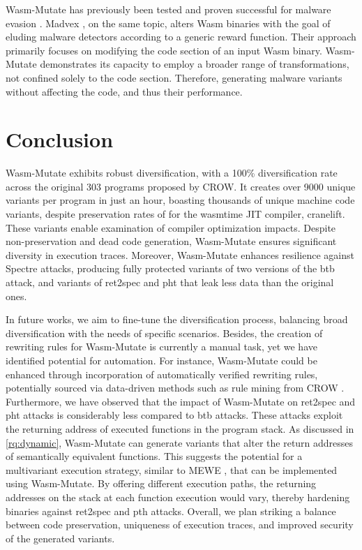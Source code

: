 \documentclass[sigplan,screen]{acmart}
\newcommand{\tool}{{\sc Wasm-Mutate}\xspace}
\begin{document}
\tool has previously been tested and proven successful for malware evasion \cite{CABRERAARTEAGA2023103296}.
Madvex \cite{madvex}, on the same topic, alters Wasm binaries with the goal of eluding malware detectors according to a generic reward function. 
Their approach primarily focuses on modifying the code section of an input Wasm binary. 
\tool demonstrates its capacity to employ a broader range of transformations, not confined solely to the code section.
Therefore, generating malware variants without affecting the code, and thus their performance.


\section{Conclusion}
\label{conc}

\tool exhibits robust diversification, with a 100\% diversification rate across the original 303 programs proposed by CROW. 
It creates over 9000 unique variants per program in just an hour, boasting thousands of unique machine code variants, despite preservation rates of \preserved for the wasmtime JIT compiler, cranelift. 
These variants enable examination of compiler optimization impacts.
Despite non-preservation and dead code generation, \tool ensures significant diversity in execution traces. 
Moreover, \tool enhances resilience against Spectre attacks, producing fully protected variants of two versions of the btb attack, and variants of ret2spec and pht that leak less data than the original ones.


In future works, we aim to fine-tune the diversification process, balancing broad diversification with the needs of specific scenarios. 
Besides, the creation of rewriting rules for \tool is currently a manual task, yet we have identified potential for automation. 
For instance, \tool could be enhanced through incorporation of automatically verified rewriting rules, potentially sourced via data-driven methods such as rule mining from CROW \cite{10026577}.
Furthermore, we have observed that the impact of \tool on ret2spec and pht attacks is considerably less compared to btb attacks. 
These attacks exploit the returning address of executed functions in the program stack. 
As discussed in \ref{rq:dynamic}, \tool can generate variants that alter the return addresses of semantically equivalent functions. 
This suggests the potential for a multivariant execution strategy, similar to MEWE \cite{MEWE}, that can be implemented using \tool. 
By offering different execution paths, the returning addresses on the stack at each function execution would vary, thereby hardening binaries against ret2spec and pth attacks.
Overall, we plan striking a balance between code preservation, uniqueness of execution traces, and improved security of the generated variants.




\end{document}
